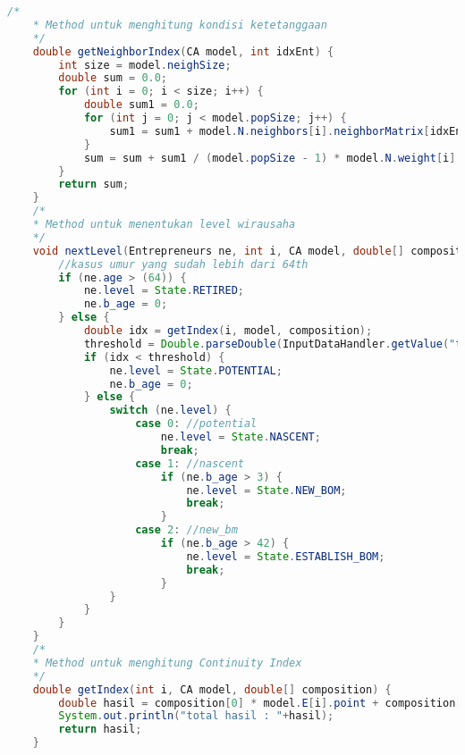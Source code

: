 \begin{lstlisting}[language=Java, caption=CA.java]
    /*
    * Method untuk menghitung kondisi ketetanggaan
    */
    double getNeighborIndex(CA model, int idxEnt) {
        int size = model.neighSize;
        double sum = 0.0;
        for (int i = 0; i < size; i++) {
            double sum1 = 0.0;
            for (int j = 0; j < model.popSize; j++) {
                sum1 = sum1 + model.N.neighbors[i].neighborMatrix[idxEnt][j];
            }
            sum = sum + sum1 / (model.popSize - 1) * model.N.weight[i];
        }
        return sum;
    }
    /*
    * Method untuk menentukan level wirausaha
    */
    void nextLevel(Entrepreneurs ne, int i, CA model, double[] composition) {
        //kasus umur yang sudah lebih dari 64th
        if (ne.age > (64)) {
            ne.level = State.RETIRED;
            ne.b_age = 0;
        } else {
            double idx = getIndex(i, model, composition);
            threshold = Double.parseDouble(InputDataHandler.getValue("threshold"));
            if (idx < threshold) {
                ne.level = State.POTENTIAL;
                ne.b_age = 0;
            } else {
                switch (ne.level) {
                    case 0: //potential
                        ne.level = State.NASCENT;
                        break;
                    case 1: //nascent
                        if (ne.b_age > 3) {
                            ne.level = State.NEW_BOM;
                            break;
                        }
                    case 2: //new_bm
                        if (ne.b_age > 42) {
                            ne.level = State.ESTABLISH_BOM;
                            break;
                        }
                }
            }
        }
    }
    /*
    * Method untuk menghitung Continuity Index
    */
    double getIndex(int i, CA model, double[] composition) {
        double hasil = composition[0] * model.E[i].point + composition[1] * this.getNeighborIndex(model, i) + composition[2] * this.pub.getPublicIdx();
        System.out.println("total hasil : "+hasil);
        return hasil;
    }


\end{lstlisting}
